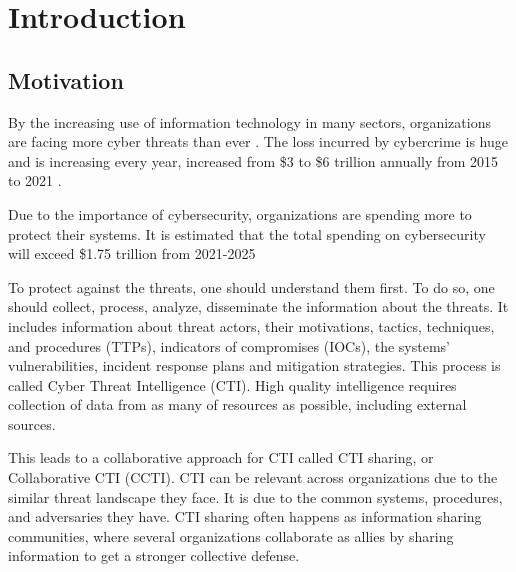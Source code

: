 \chapter{Introduction}



\section{Motivation}

By the increasing use of information technology in many sectors, organizations are facing more cyber threats than ever \cite{skopik_problem_2016}. The loss incurred by cybercrime is huge and is  increasing every year, increased from \$3 to \$6 trillion annually from 2015 to 2021 \cite{noauthor_2023_nodate}.

Due to the importance of cybersecurity, organizations are spending more to protect their systems. It is estimated that the total spending on cybersecurity will exceed \$1.75 trillion from 2021-2025 \cite{freeze_global_2021}

To protect against the threats, one should understand them first. To do so, one should collect, process, analyze, disseminate the information about the threats. It includes information about threat actors, their motivations, tactics, techniques, and procedures (TTPs), indicators of compromises (IOCs), the systems' vulnerabilities, incident response plans and mitigation strategies. This process is called Cyber Threat Intelligence (CTI). High quality intelligence requires collection of data from as many of resources as possible, including external sources.

This leads to a collaborative approach for CTI called CTI sharing, or Collaborative CTI (CCTI). CTI can be relevant across organizations due to the similar threat landscape they face. It is due to the common systems, procedures, and adversaries they have. CTI sharing often happens as information sharing communities, where several organizations collaborate as allies by sharing information to get a stronger collective defense.

